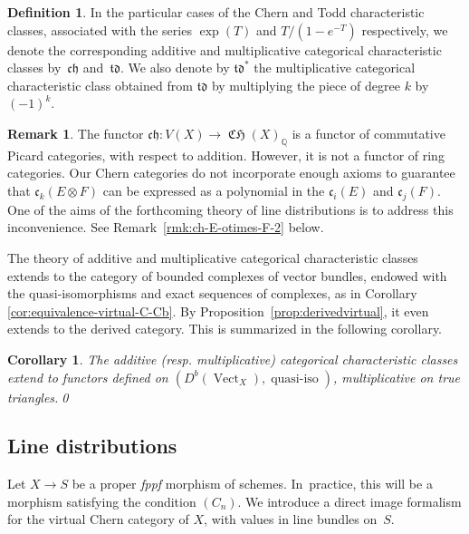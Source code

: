 \documentclass[11pt]{article}
\newcommand{\resp}{resp.\xspace}
\theoremstyle{plain}
\newtheorem{corollary}[theorem]{Corollary}
\theoremstyle{definition}
\newtheorem{definition}[theorem]{Definition}
\newtheorem{remark}[theorem]{Remark}
\newcommand{\QBbb}{\mathbb Q}
\newcommand{\cfrak}{\mathfrak c}
\newcommand{\chfrak}{\mathfrak {ch}}
\newcommand{\tdfrak}{\mathfrak {td}}
\newcommand{\fppf}{\emph{fppf}\xspace}
\DeclareMathOperator{\CHfrak}{\mathfrak{CH}}
\DeclareMathOperator{\qiso}{quasi-iso}
\DeclareMathOperator{\Vect}{Vect}
\begin{document}
\begin{definition}\label{def:ChernToddchar}
In the particular cases of the Chern and Todd characteristic classes, associated with the series $\exp(T)$ and $T/(1-e^{-T})$ respectively, we denote the corresponding additive and multiplicative categorical characteristic classes by~$\chfrak$ and~$\tdfrak$. We also denote by $\tdfrak^{*}$ the multiplicative categorical characteristic class obtained from $\tdfrak$ by multiplying the piece of degree $k$ by $(-1)^{k}$.
\end{definition}

\begin{remark}\label{rmk:ch-E-otimes-F}
The functor $\chfrak\colon V(X)\to\CHfrak(X)_{\QBbb}$ is a functor of commutative \hbox{Picard} categories, with respect to addition. However, it is not a functor of ring categories. Our Chern categories do not incorporate enough axioms to guarantee that $\cfrak_{k}(E\otimes F)$ can be expressed as a polynomial in the $\cfrak_{i}(E)$ and $\cfrak_{j}(F)$. One of the aims of the forthcoming theory of line distributions is to address this inconvenience. See Remark~\ref{rmk:ch-E-otimes-F-2} below.
\end{remark}

The theory of additive and multiplicative categorical characteristic classes extends to the category of bounded complexes of vector bundles, endowed with the quasi-isomorphisms and exact sequences of complexes, as in Corollary \ref{cor:equivalence-virtual-C-Cb}. By Proposition~\ref{prop:derivedvirtual}, it even extends to the derived category. This is summarized in the following corollary.

\begin{corollary}\label{cor:characteristic-derived}
The additive (\resp multiplicative) categorical characteristic classes extend to functors defined on $(D^b(\Vect_X), \qiso)$, multiplicative on true triangles.\qed
\end{corollary}

\subsection{Line distributions}\label{subsec:line-distributions}
Let $X\to S$ be a proper \fppf morphism of schemes. In~practice, this will be a morphism satisfying the condition $(C_{n})$. We introduce a direct image formalism for the virtual Chern category of $X$, with values in line bundles on~$S$.\enlargethispage{.5\baselineskip}%
\end{document}
